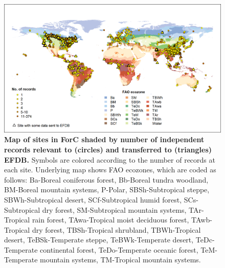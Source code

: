 \documentclass[, manuscript]{copernicus}
\begin{document}
\begin{figure}
\includegraphics[width=15cm]{figures_tables/World_Map_of_sites_with_FAO_and_IPCC_data_sent} \caption{\textbf{Map of sites in ForC shaded by number of independent records relevant to (circles) and transferred to (triangles) EFDB.} Symbols are colored according to the number of records at each site. Underlying map shows FAO ecozones, which are coded as follows: Ba-Boreal coniferous forest, Bb-Boreal tundra woodland, BM-Boreal mountain systems, P-Polar, SBSh-Subtropical steppe, SBWh-Subtropical desert, SCf-Subtropical humid forest, SCs-Subtropical dry forest, SM-Subtropical mountain systems, TAr-Tropical rain forest,  TAwa-Tropical moist deciduous forest, TAwb-Tropical dry forest, TBSh-Tropical shrubland, TBWh-Tropical desert, TeBSk-Temperate steppe, TeBWk-Temperate desert, TeDc-Temperate continental forest, TeDo-Temperate oceanic forest, TeM-Temperate mountain systems, TM-Tropical mountain systems.}\label{fig:fig_map}
\end{figure}
\end{document}
